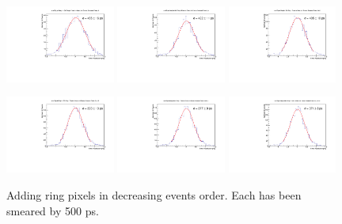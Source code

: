 \documentclass[twocolumn,aps,prd,reprint,superscriptaddress,floatfix]{revtex4-1}
\begin{document}
\begin{figure}[!htbp]
\centering
	\includegraphics[width=0.32\textwidth]{SKIROC_1_Pixels_NoCenter500.pdf}
	\includegraphics[width=0.32\textwidth]{SKIROC_2_Pixels_NoCenter500.pdf}
	\includegraphics[width=0.32\textwidth]{SKIROC_3_Pixels_NoCenter500.pdf}

	\includegraphics[width=0.32\textwidth]{SKIROC_4_Pixels_NoCenter500.pdf}
	\includegraphics[width=0.32\textwidth]{SKIROC_5_Pixels_NoCenter500.pdf}
	\includegraphics[width=0.32\textwidth]{SKIROC_6_Pixels_NoCenter500.pdf}
	\caption{Adding ring pixels in decreasing events order.
		Each has been smeared by 500 ps.}
	\label{fig:500psAll_NoCenter}
\end{figure}
\end{document}
